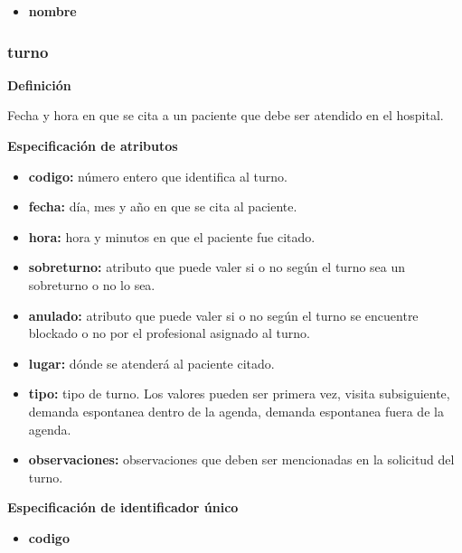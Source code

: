\documentclass[a4paper,11pt]{article}
\begin{document}
\begin{itemize}

     \item \textbf{nombre}

\end{itemize}

\subsubsection{\textbf{turno}}

\textbf{Definición}

Fecha y hora en que se cita a un paciente que debe ser atendido en el hospital.

\textbf{Especificación de atributos}

\begin{itemize}

     \item \textbf{codigo:} número entero que identifica al turno.

     \item \textbf{fecha:} día, mes y año en que se cita al paciente.

     \item \textbf{hora:} hora y minutos en que el paciente fue citado.

     \item \textbf{sobreturno:} atributo que puede valer si o no según el turno sea un sobreturno 
     o no lo sea.

     \item \textbf{anulado:} atributo que puede valer si o no según el turno se encuentre blockado 
     o no por el profesional asignado al turno.

     \item \textbf{lugar:} dónde se atenderá al paciente citado.

     \item \textbf{tipo:} tipo de turno. Los valores pueden ser primera vez, visita subsiguiente, 
     demanda espontanea dentro de la agenda, demanda espontanea fuera de la agenda.

     \item \textbf{observaciones:} observaciones que deben ser mencionadas en la solicitud del turno.

\end{itemize}

\textbf{Especificación de identificador único}

\begin{itemize}

     \item \textbf{codigo}

\end{itemize}
\end{document}
